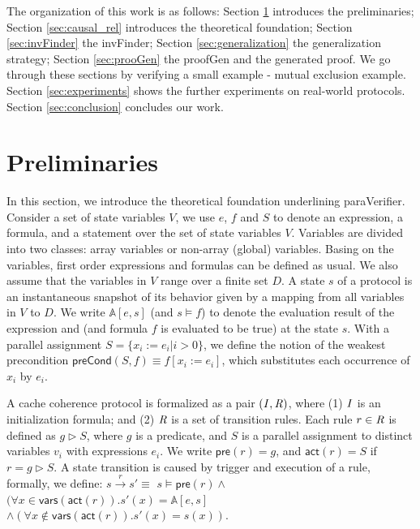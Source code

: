 \documentclass[final]{IEEEtran}
\begin{document}
{The organization of this work is as follows: Section \ref{sec:Preliminaries} introduces the preliminaries; Section  \ref{sec:causal_rel} introduces the theoretical foundation; Section \ref{sec:invFinder} the {\sf invFinder}; Section \ref{sec:generalization} the generalization strategy; Section \ref{sec:prooGen} the {\sf proofGen} and the generated proof. We go through these sections by verifying a small example - mutual exclusion example. Section \ref{sec:experiments} shows the further experiments on real-world protocols. Section \ref{sec:conclusion} concludes our work.

\section{Preliminaries}\label{sec:Preliminaries}
In this section, we introduce the theoretical foundation underlining
{\sf paraVerifier}. Consider a set of state variables $V$,
we use $e$, $f$ and $S$ to denote an
expression, a formula, and a statement over the set of state
variables $V$.
Variables are divided into two classes: array variables or
non-array (global) variables. Basing on the variables, first order expressions and formulas can be defined as usual. We also assume that the variables in $V$ range over a finite set $D$.
A state $s$  of a protocol is an
instantaneous snapshot of its behavior given by a mapping from
all variables in $V$ to $D$.  We write
$\mathbb{A}[e,s]$ (and $s \models f$) to denote the
evaluation result of the expression and (and formula $f$ is  evaluated to be true) at the state $s$.
With a parallel assignment $S=\{x_i:=e_i | i>0\}$,
we define the notion of the weakest precondition $\mathsf{preCond}(S,f)\equiv f[x_i:=e_i]$, which substitutes each
occurrence of $x_i$ by $e_i$.

\smallskip
{}
A cache coherence protocol is formalized as a pair $({\it I}, {\it R})$, where
(1) ${\it I}$ is an initialization formula; and
(2) ${\it R}$ is a set of transition rules. Each rule $r\in {\it R}$ is defined as
  $g \vartriangleright  S$, where $g$ is a predicate, and $S$ is a
  parallel assignment to distinct  variables $v_i$ with expressions
  $e_i$. We write $\mathsf{pre}(r)=g$, and $\mathsf{act}(r)=S$
  if $r=g \vartriangleright S$. A state transition is caused by   trigger and execution of a rule, formally, we define: $s\overset{r}{\rightarrow } s' \equiv$ $s \models \mathsf{pre}(r)\wedge$$(\forall x \in \mathsf{vars}(\mathsf{act}(r)). s'(x)=\mathbb{A}[e,s]$ $\wedge (\forall x \notin \mathsf{vars}(\mathsf{act}(r)). s'(x) = s(x))$.

}
\end{document}
